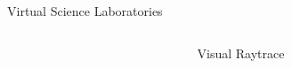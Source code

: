 \documentclass[final,hyperref={pdfpagelabels=false}]{beamer}
\begin{document}
\begin{frame}[t]
\begin{columns}[t]
\begin{column}{0.465\textwidth}
\begin{block}{Virtual Science Laboratories}
     
   
   
\end{block}


\end{column} %



\begin{column}{.025\textwidth}\end{column} %

\end{columns} %




\begin{columns}[t] %

\begin{column}{.025\textwidth}\end{column} %

\begin{column}{.96\textwidth} %


\begin{block}{Visual Raytrace}

    \begin{figure}
        \centering
        

\end{figure}
\end{block}
\end{column}
\end{columns}
\end{frame}
\end{document}
